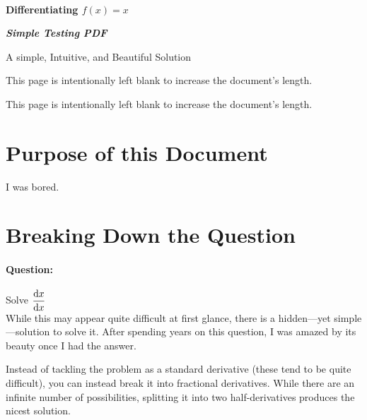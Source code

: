 \documentclass[a4paper, twoside]{article}
\newcommand{\copyrightpage}{
  \pagestyle{copyright}
}
\newcommand{\standardpage}{
    \pagestyle{standard}
}
\begin{document}
\copyrightpage
\ \vspace{1.5em}
\begin{center}
    {\Huge\bfseries Differentiating $f(x)=x$ \par}
    {\huge\bfseries \textit{Simple Testing PDF} \par}
    \vspace{0.1em}
    {\LARGE A simple, Intuitive, and Beautiful Solution \par}
    \vspace{0.4em}
\end{center}

\newpage
\standardpage
{}
\setcounter{page}{1}
\begin{center}
    This page is intentionally left blank to increase the document's length.
\end{center}

\newpage

\tableofcontents

\newpage

\begin{center}
    This page is intentionally left blank to increase the document's length.
\end{center}

\newpage
{}
\setcounter{page}{1}
\section{Purpose of this Document}
I was bored.

\newpage

\newpage
\section{Breaking Down the Question}
\paragraph{Question:} Solve \(\displaystyle \frac{\text{d} x}{\text{d} x}\)\\

While this may appear quite difficult at first glance, there is a hidden---yet simple---solution to solve it. After spending years on this question, I was amazed by its beauty once I had the answer.

Instead of tackling the problem as a standard derivative (these tend to be quite difficult), you can instead break it into fractional derivatives. While there are an infinite number of possibilities, splitting it into two half-derivatives produces the nicest solution.
\end{document}
